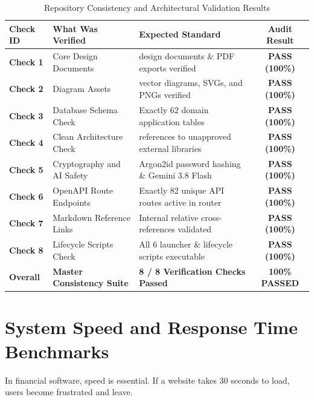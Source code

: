 \begin{table}[H]
\centering
\small
\caption{Repository Consistency and Architectural Validation Results}
\label{tab:validator_results}
\begin{tabularx}{\textwidth}{l >{\RaggedRight\arraybackslash}p{4.2cm} >{\RaggedRight\arraybackslash}X c}
\toprule
\textbf{Check ID} & \textbf{What Was Verified} & \textbf{Expected Standard} & \textbf{Audit Result} \\
\midrule
\textbf{Check 1} & Core Design Documents & 41 design documents \& PDF exports verified & \textbf{PASS (100\%)} \\
\textbf{Check 2} & Diagram Assets & 24 vector diagrams, SVGs, and PNGs verified & \textbf{PASS (100\%)} \\
\textbf{Check 3} & Database Schema Check & Exactly 62 domain application tables & \textbf{PASS (100\%)} \\
\textbf{Check 4} & Clean Architecture Check & 0 references to unapproved external libraries & \textbf{PASS (100\%)} \\
\textbf{Check 5} & Cryptography and AI Safety & Argon2id password hashing \& Gemini 3.8 Flash & \textbf{PASS (100\%)} \\
\textbf{Check 6} & OpenAPI Route Endpoints & Exactly 82 unique API routes active in router & \textbf{PASS (100\%)} \\
\textbf{Check 7} & Markdown Reference Links & Internal relative cross-references validated & \textbf{PASS (100\%)} \\
\textbf{Check 8} & Lifecycle Scripts Check & All 6 launcher \& lifecycle scripts executable & \textbf{PASS (100\%)} \\
\midrule
\textbf{Overall} & \textbf{Master Consistency Suite} & \textbf{8 / 8 Verification Checks Passed} & \textbf{100\% PASSED} \\
\bottomrule
\end{tabularx}
\end{table}

\section{System Speed and Response Time Benchmarks}
In financial software, speed is essential. If a website takes 30 seconds to load, users become frustrated and leave.

